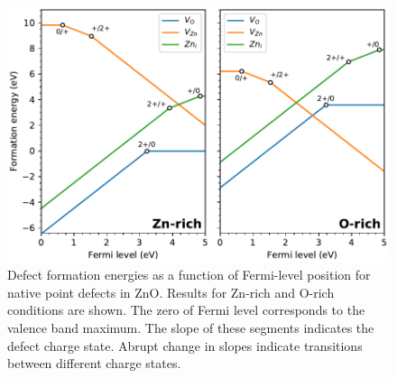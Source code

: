 \begin{figure}[tbh!]
	\centering
	\includegraphics[width=0.65\linewidth]{"images/rnd/defect-formation"}
	\caption[Defect formation energies as a function of Fermi-level position for native point defects in ZnO]{Defect formation energies as a function of Fermi-level position for native point defects in ZnO. Results for Zn-rich and O-rich conditions are shown. The zero of Fermi level corresponds to the valence band maximum. The slope of these segments indicates the defect charge state. Abrupt change in slopes indicate transitions between different charge states.}
\end{figure}

\begingroup
\setlength{\tabcolsep}{20pt}
\begin{table}[tbh!]
	\centering
	\caption{Calculated defect formation energies at $E_f = 0$ for native point defects in ZnO under oxygen-poor and oxygen-rich conditions.}
	\label{tab:E_formation}
	\end{table}
\endgroup


